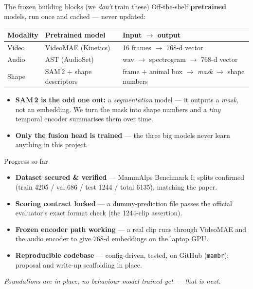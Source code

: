 \documentclass[aspectratio=169,11pt]{beamer}
\begin{document}
\begin{frame}{The frozen building blocks (we \emph{don't} train these)}
  Off-the-shelf \textbf{pretrained} models, run once and cached --- never updated:
  \vfill
  \begin{center}\footnotesize
  \begin{tabular}{@{}llp{4.8cm}@{}}
    \toprule
    Modality & Pretrained model & Input $\rightarrow$ output \\
    \midrule
    Video & VideoMAE (Kinetics) & 16 frames $\rightarrow$ 768-d vector \\
    Audio & AST (AudioSet)      & wav $\rightarrow$ spectrogram $\rightarrow$ 768-d vector \\
    Shape & SAM\,2 $+$ shape descriptors & frame $+$ animal box $\rightarrow$ \emph{mask} $\rightarrow$ shape numbers \\
    \bottomrule
  \end{tabular}
  \end{center}
  \vfill
  \begin{itemize}
    \item \textbf{SAM\,2 is the odd one out:} a \emph{segmentation} model --- it outputs a
          \emph{mask}, not an embedding. We turn the mask into shape numbers and a
          \emph{tiny} temporal encoder summarises them over time.
    \item \textbf{Only the fusion head is trained} --- the three big models never learn
          anything in this project.
  \end{itemize}
\end{frame}

\begin{frame}{Progress so far}
  \begin{itemize}
    \item \textbf{Dataset secured \& verified} --- MammAlps Benchmark I; splits confirmed
          (train 4205 / val 686 / test 1244 / total 6135), matching the paper.
    \item \textbf{Scoring contract locked} --- a dummy-prediction file passes the official
          evaluator's exact format check (the 1244-clip assertion).
    \item \textbf{Frozen encoder path working} --- a real clip runs through VideoMAE and the
          audio encoder to give 768-d embeddings on the laptop GPU.
    \item \textbf{Reproducible codebase} --- config-driven, tested, on GitHub
          (\texttt{mambr}); proposal and write-up scaffolding in place.
  \end{itemize}
  \vfill
  \begin{center}
    \emph{Foundations are in place; no behaviour model trained yet --- that is next.}
  \end{center}
\end{frame}
\end{document}
